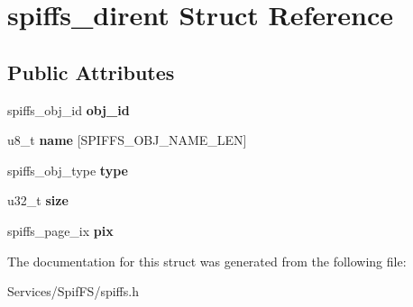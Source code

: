 \hypertarget{structspiffs__dirent}{}\section{spiffs\+\_\+dirent Struct Reference}
\label{structspiffs__dirent}
\subsection*{Public Attributes}
\begin{DoxyCompactItemize}
\item 
\hypertarget{structspiffs__dirent_adb9c8e8a7c378611c58c02c4a28a9d85}{}spiffs\+\_\+obj\+\_\+id {\bfseries obj\+\_\+id}\label{structspiffs__dirent_adb9c8e8a7c378611c58c02c4a28a9d85}

\item 
\hypertarget{structspiffs__dirent_abd0b462b485b05eb9ee1703b1ee5beab}{}u8\+\_\+t {\bfseries name} \mbox{[}S\+P\+I\+F\+F\+S\+\_\+\+O\+B\+J\+\_\+\+N\+A\+M\+E\+\_\+\+L\+E\+N\mbox{]}\label{structspiffs__dirent_abd0b462b485b05eb9ee1703b1ee5beab}

\item 
\hypertarget{structspiffs__dirent_a38414e80ef79bb9dcf421555e9435f89}{}spiffs\+\_\+obj\+\_\+type {\bfseries type}\label{structspiffs__dirent_a38414e80ef79bb9dcf421555e9435f89}

\item 
\hypertarget{structspiffs__dirent_a5cbe52f4c2bb069e109857246decc01b}{}u32\+\_\+t {\bfseries size}\label{structspiffs__dirent_a5cbe52f4c2bb069e109857246decc01b}

\item 
\hypertarget{structspiffs__dirent_af3dd1aaf484385078fa8f171c6c9456d}{}spiffs\+\_\+page\+\_\+ix {\bfseries pix}\label{structspiffs__dirent_af3dd1aaf484385078fa8f171c6c9456d}

\end{DoxyCompactItemize}


The documentation for this struct was generated from the following file\+:\begin{DoxyCompactItemize}
\item 
Services/\+Spif\+F\+S/spiffs.\+h\end{DoxyCompactItemize}
